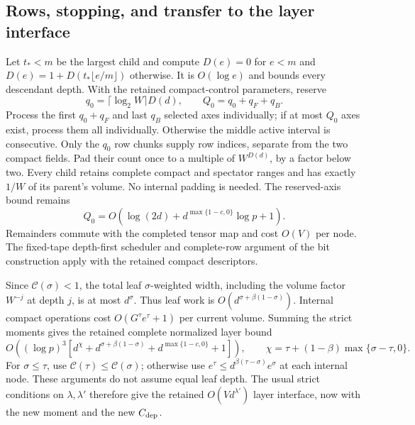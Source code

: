 \subsection{Rows, stopping, and transfer to the layer interface}
Let $t_*<m$ be the largest child and compute
$D(e)=0$ for $e<m$ and $D(e)=1+D(t_*\lfloor e/m\rfloor)$ otherwise.
It is $O(\log e)$ and bounds every descendant depth.
With the retained compact-control parameters, reserve
\[
 q_0=\lceil\log_2W\rceil D(d),\qquad Q_0=q_0+q_F+q_B.
\]
Process the first $q_0+q_F$ and last $q_B$ selected axes individually;
if at most $Q_0$ axes exist, process them all individually. Otherwise
the middle active interval is consecutive. Only the $q_0$ row chunks
supply row indices, separate from the two compact fields. Pad their
count once to a multiple of $W^{D(d)}$, by a factor below two.
Every child retains complete compact and spectator ranges and has
exactly $1/W$ of its parent's volume. No internal padding is needed.
The reserved-axis bound remains
\[
 Q_0=O(\log(2d)+d^{\max\{1-c,0\}}\log p+1).
\]
Remainders commute with the completed tensor map and cost $O(V)$ per
node. The fixed-tape depth-first scheduler and complete-row argument
of the bit construction apply with the retained compact descriptors.

Since $\mathcal C(\sigma)<1$, the total leaf $\sigma$-weighted width,
including the volume factor $W^{-j}$ at depth $j$, is at most
$d^\sigma$. Thus leaf work is
$O(d^{\sigma+\beta(1-\sigma)})$. Internal compact operations cost
$O(G^\tau e^\tau+1)$ per current volume. Summing the strict moments
gives the retained complete normalized layer bound
\[
 O\!\left((\log p)^3\left[
 d^\chi+d^{\sigma+\beta(1-\sigma)}+d^{\max\{1-c,0\}}+1
 \right]\right),\qquad
 \chi=\tau+(1-\beta)\max\{\sigma-\tau,0\}.
\]
For $\sigma\le\tau$, use $\mathcal C(\tau)\le\mathcal C(\sigma)$;
otherwise use $e^\tau\le d^{\beta(\tau-\sigma)}e^\sigma$ at each
internal node. These arguments do not assume equal leaf depth.
The usual strict conditions on $\lambda,\lambda'$ therefore give
the retained $O(Vd^{\lambda'})$ layer interface, now with the new
moment and the new $C_{\rm dep}$.

